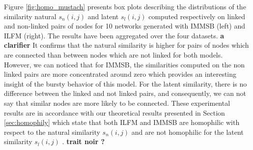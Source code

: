 Figure \ref{fig:homo_mustach} presents box plots describing  the distributions of the similarity natural $s_n(i,j)$ and latent $s_l(i,j)$ computed respectively on linked and non-linked pairs of nodes for 10 networks generated with IMMSB (left) and ILFM (right). The results have been aggregated over the four datasets.  \textbf{ a clarifier} It confirms that the natural similarity is  higher for  pairs of nodes which are connected than between nodes which are not linked for both models. However, we can noticed that for IMMSB, the similarities computed on the non linked pairs are more concentrated around zero which provides an interesting insight of the bursty behavior of this model. For the latent similarity,  there is no difference between the linked and not linked pairs, and consequently, we can not say that similar nodes are more likely to be connected. These experimental results are in accordance with our theoretical results presented in Section \ref{sec:homophily} which state that both ILFM and IMMSB are homophilic with respect to the natural similarity $s_n(i,j)$ and are not homophilic for the latent similarity $s_l(i,j)$ .
\textbf{trait noir ?}
